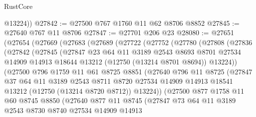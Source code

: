 \begin{lexlean}{RustCore}
\begin{coremodule}
        @13224))
@27842 := @27500 @767 @1760 @11 @62 @8706 @8852
@27845 := @27640 @767 @11 @8706
@27847 := @27701 @206 @23
@28080 := @27651
    (@27654
      (@27669
        (@27683
          (@27689
            (@27722
              (@27752
                (@27780
                  (@27808
                    (@27836
                      (@27842
                        (@27845
                          (@27847
                            @23
                            @64
                            @11
                            @3189
                            @2543
                            @8693
                            @8701
                            @27534
                            @14909
                            @14913
                            @18644
                            @13212
                            (@12750 (@13214 @8701 @8694))
                            @13224))
                        (@27500
                          @796
                          @1759
                          @11
                          @61
                          @8725
                          @8851
                          (@27640
                            @796
                            @11
                            @8725
                            (@27847
                              @37
                              @64
                              @11
                              @3189
                              @2543
                              @8711
                              @8720
                              @27534
                              @14909
                              @14913
                              @18541
                              @13212
                              (@12750 (@13214 @8720 @8712))
                              @13224))
                          (@27500
                            @877
                            @1758
                            @11
                            @60
                            @8745
                            @8850
                            (@27640
                              @877
                              @11
                              @8745
                              (@27847
                                @73
                                @64
                                @11
                                @3189
                                @2543
                                @8730
                                @8740
                                @27534
                                @14909
                                @14913

\end{coremodule}
\end{lexlean}
